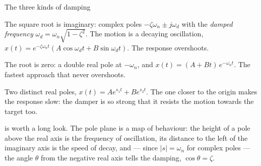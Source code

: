 \begin{definition}{The three kinds of damping}
\begin{description}[leftmargin=0pt, itemsep=3pt, font=\sffamily\small\bfseries]
  \item[Underdamped, $0<\zeta<1$.] The square root is imaginary: complex poles $-\zeta\omega_n \pm j\omega_d$ with the \emph{damped frequency} $\omega_d = \omega_n\sqrt{1-\zeta^2}$. The motion is a decaying oscillation, $x(t) = e^{-\zeta\omega_n t}(A\cos\omega_d t + B\sin\omega_d t)$. The response overshoots.
  \item[Critically damped, $\zeta = 1$.] The root is zero: a double real pole at $-\omega_n$, and $x(t) = (A + Bt)\,e^{-\omega_n t}$. The fastest approach that never overshoots.
  \item[Overdamped, $\zeta > 1$.] Two distinct real poles, $x(t) = A e^{s_1 t} + B e^{s_2 t}$. The one closer to the origin makes the response slow: the damper is so strong that it resists the motion towards the target too.
\end{description}
\end{definition}


 is worth a long look. The pole plane is a map of behaviour: the height of a pole above the real axis is the frequency of oscillation, its distance to the left of the imaginary axis is the speed of decay, and — since $|s| = \omega_n$ for complex poles — the angle $\theta$ from the negative real axis tells the damping, $\cos\theta = \zeta$.

